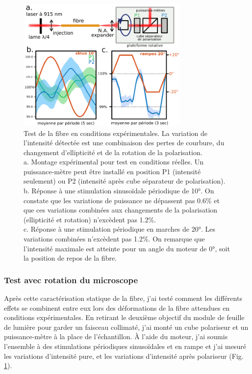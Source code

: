 \begin{figure}
    \centering
    \includegraphics[width=0.75\textwidth]{./files/real-condition_intensity-variation.svg.png}
    \caption{Test de la fibre en conditions expérimentales. La variation de l'intensité détectée est une combinaison des pertes de courbure, du changement d'ellipticité et de la rotation de la polarisation. 
    \\ a. Montage expérimental pour test en conditions réelles. Un puissance-mètre peut être installé en position P1 (intensité seulement) ou P2 (intensité après cube séparateur de polarisation).
    \\ b. Réponse à une stimulation sinusoïdale périodique de 10°. On constate que les variations de puissance ne dépassent pas 0.6\% et que ces variations combinées aux changements de la polarisation (ellipticité et rotation) n'excèdent pas 1.2\%.
    \\ c. Réponse à une stimulation périodique en marches de 20°. Les variations combinées n'excèdent pas 1.2\%. On remarque que l'intensité maximale est atteinte pour un angle du moteur de 0°, soit la position de repos de la fibre.
    \label{FIGrealconditionsfiber}}
    \end{figure}


\subsubsection{Test avec rotation du microscope}

Après cette caractérisation statique de la fibre, j'ai testé comment les différents effets se combinent entre eux lors des déformations de la fibre attendues en conditions expérimentales. En retirant le deuxième objectif du module de feuille de lumière pour garder un faisceau collimaté, j'ai monté un cube polariseur et un puissance-mètre à la place de l'échantillon. À l'aide du moteur, j'ai soumis l'ensemble à des stimulations périodiques sinusoïdales et en rampe et j'ai mesuré les variations d'intensité pure, et les variations d'intensité après polariseur (Fig. \ref{FIGrealconditionsfiber}).


